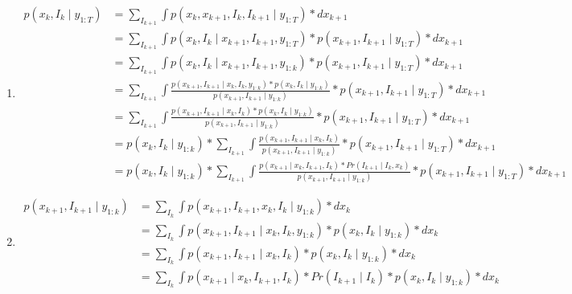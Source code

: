 \documentclass[times, twoside, watermark]{zHenriquesLab-StyleBioRxiv}
\begin{document}
\begin{enumerate}
\item
$$
\begin{align*}
p(x_{k}, I_{k} \mid y_{1:T}) &= \sum_{I_{k+1}} \int p(x_{k}, x_{k+1}, I_{k}, I_{k+1} \mid y_{1:T}) * dx_{k+1}
\\ &= \sum_{I_{k+1}} \int p(x_{k}, I_{k} \mid x_{k+1}, I_{k+1}, y_{1:T}) * p(x_{k+1}, I_{k+1} \mid y_{1:T}) * dx_{k+1}
\\ &= \sum_{I_{k+1}} \int p(x_{k}, I_{k} \mid x_{k+1}, I_{k+1}, y_{1:k}) * p(x_{k+1}, I_{k+1} \mid y_{1:T}) * dx_{k+1}
\\ &= \sum_{I_{k+1}} \int \frac{p(x_{k+1}, I_{k+1} \mid x_{k}, I_{k}, y_{1:k}) * p(x_{k}, I_{k} \mid y_{1:k})}{p(x_{k+1}, I_{k+1} \mid y_{1:k})} * p(x_{k+1}, I_{k+1} \mid y_{1:T}) * dx_{k+1} 
\\ &= \sum_{I_{k+1}} \int \frac{p(x_{k+1}, I_{k+1} \mid x_{k}, I_{k}) * p(x_{k}, I_{k} \mid y_{1:k})}{p(x_{k+1}, I_{k+1} \mid y_{1:k})} * p(x_{k+1}, I_{k+1} \mid y_{1:T}) * dx_{k+1}
\\ &= p(x_{k}, I_{k} \mid y_{1:k}) * \sum_{I_{k+1}} \int \frac{p(x_{k+1}, I_{k+1} \mid x_{k}, I_{k})}{p(x_{k+1}, I_{k+1} \mid y_{1:k})} * p(x_{k+1}, I_{k+1} \mid y_{1:T}) * dx_{k+1} 
\\ &= p(x_{k}, I_{k} \mid y_{1:k}) * \sum_{I_{k+1}} \int \frac{p(x_{k+1} \mid x_{k}, I_{k+1}, I_{k}) * Pr(I_{k+1} \mid I_{k}, x_{k})}{p(x_{k+1}, I_{k+1} \mid y_{1:k})} * p(x_{k+1}, I_{k+1} \mid y_{1:T}) * dx_{k+1}
\end{align*}$$

\item
$$
\begin{align*}
p(x_{k+1}, I_{k+1} \mid y_{1:k}) &= \sum_{I_{k}} \int p(x_{k+1}, I_{k+1}, x_{k}, I_{k} \mid y_{1:k}) * dx_{k}
\\ &= \sum_{I_{k}} \int p(x_{k+1}, I_{k+1} \mid x_{k}, I_{k}, y_{1:k}) * p(x_{k}, I_{k} \mid y_{1:k}) * dx_{k}
\\ &= \sum_{I_{k}} \int p(x_{k+1}, I_{k+1} \mid x_{k}, I_{k}) * p(x_{k}, I_{k} \mid y_{1:k}) * dx_{k}
\\ &= \sum_{I_{k}} \int p(x_{k+1} \mid x_{k}, I_{k+1}, I_{k}) * Pr(I_{k+1} \mid I_{k}) * p(x_{k}, I_{k} \mid y_{1:k}) * dx_{k}
\end{align*}$$

\end{enumerate}

\newpage

\captionsetup*{format=largeformat}
\end{document}

